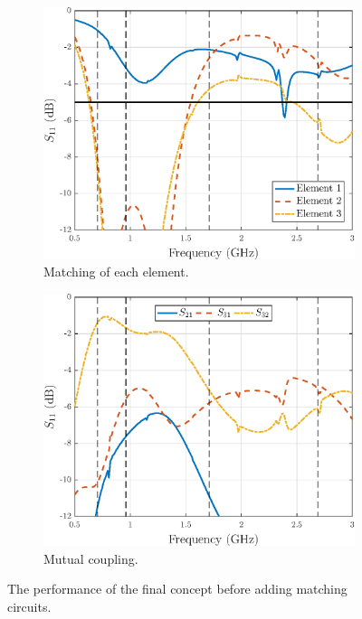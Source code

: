 \begin{figure}[H]
    \centering
    \begin{subfigure}[b]{0.49\textwidth}
        \includegraphics[width=\textwidth]{img/main_final_res.eps}
        \caption{Matching of each element.}
        \label{fig:main_final_res}
    \end{subfigure}
    \begin{subfigure}[b]{0.49\textwidth}
        \includegraphics[width=\textwidth]{img/main_final_res_coup.eps}
        \caption{Mutual coupling.}
        \label{fig:main_final_res_coup}
    \end{subfigure}
    \vspace{-7pt}
    \caption{The performance of the final concept before adding matching circuits.}
    \label{fig:main_res}
\end{figure}


